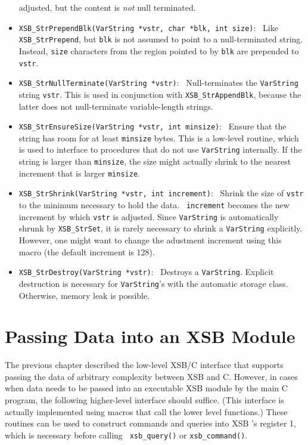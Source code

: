 \begin{itemize}
    adjusted, but the content is \emph{not} null terminated.
  \item {\tt XSB\_StrPrependBlk(VarString *vstr, char *blk, int size)}:~
    Like {\tt XSB\_StrPrepend}, but {\tt blk} is not assumed to point to a
    null-terminated string. Instead, {\tt size} characters from the region
    pointed to by {\tt blk} are prepended to {\tt vstr}.
  \item {\tt XSB\_StrNullTerminate(VarString *vstr)}:~
    Null-terminates the {\tt VarString}  string {\tt vstr}. This is used in
    conjunction with {\tt XSB\_StrAppendBlk}, because the latter does not
    null-terminate variable-length strings.
  \item {\tt XSB\_StrEnsureSize(VarString *vstr, int minsize)}:~
    Ensure that the string has room for at least {\tt minsize} bytes.
    This is a low-level routine, which is used to interface to procedures
    that do not use {\tt VarString} internally. If the string is larger
    than {\tt minsize}, the size might actually shrink to the nearest
    increment that is larger {\tt minsize}.
  \item {\tt XSB\_StrShrink(VarString *vstr, int increment)}:~ Shrink the
    size of {\tt vstr} to the minimum necessary to hold the data. {\tt
      increment} becomes the new increment by which {\tt vstr} is adjusted.
    Since {\tt VarString} is automatically shrunk by {\tt XSB\_StrSet}, it
    is rarely necessary to shrink a {\tt VarString} explicitly.  However,
    one might want to change the adustment increment using this macro (the
    default increment is 128).
  \item {\tt XSB\_StrDestroy(VarString *vstr)}:~
    Destroys a {\tt VarString}.  Explicit destruction is necessary for
    {\tt VarString}'s with the automatic storage class. Otherwise, memory
    leak is possible.
\end{itemize}


\section{Passing Data into an XSB Module}

The previous chapter described the low-level XSB/C interface that supports
passing the data of arbitrary complexity between XSB and C. However, in
cases when data needs to be passed into an executable XSB module by the
main C program, the following higher-level interface should suffice.  (This
interface is actually implemented using macros that call the lower level
functions.)  These routines can be used to construct commands and queries
into XSB 's register 1, which is necessary before calling {\tt
  xsb\_query()} or {\tt xsb\_command()}.


